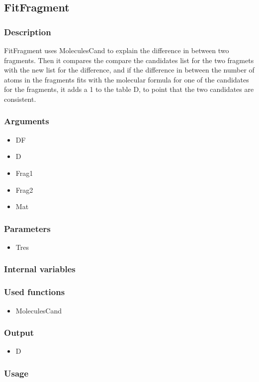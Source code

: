 \subsection{FitFragment}
\subsubsection{Description}
FitFragment uses MoleculesCand to explain the difference in between two fragments. Then it compares the compare the candidates list for the two fragmets with the new list for the difference, and if the difference in between the number of atoms in the fragments fits with the molecular formula for one of the candidates for the fragments, it adds a 1 to the table D, to point that the two candidates are consistent.
\subsubsection{Arguments}
\begin{itemize}
\item DF
\item D
\item Frag1
\item Frag2
\item Mat
\end{itemize}
\subsubsection{Parameters}
\begin{itemize}
\item Tres
\end{itemize}
\subsubsection{Internal variables}
\subsubsection{Used functions}
\begin{itemize}
\item MoleculesCand
\end{itemize}
\subsubsection{Output}
\begin{itemize}
\item D
\end{itemize}
\subsubsection{Usage}



